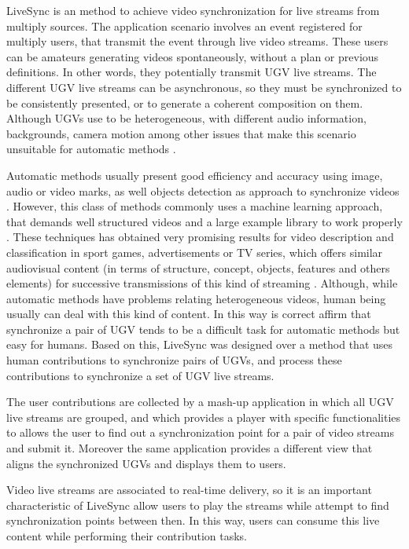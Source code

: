 
LiveSync is an method to achieve video synchronization for live streams from multiply sources. The application scenario involves an event registered for multiply users, that transmit the event through live video streams. These users can be amateurs generating videos spontaneously, without a plan or previous definitions. In other words, they potentially transmit UGV live streams. The different UGV live streams can be asynchronous, so they must be synchronized to be consistently presented, or to generate a coherent composition on them. Although UGVs use to be heterogeneous, with different audio information, backgrounds, camera motion among other issues that make this scenario unsuitable for automatic methods \cite{schweiger2013fully}.

Automatic methods usually present good efficiency and accuracy using image, audio or video marks, as well objects detection as approach to synchronize videos \cite{key:article}. However, this class of methods commonly uses a machine learning approach, that demands well structured videos and a large example library to work properly \cite{KarpathyCVPR14}. These techniques has obtained very promising results for video description and classification in sport games, advertisements or TV series, which offers similar audiovisual content (in terms of structure, concept, objects, features and others elements) for successive transmissions of this kind of streaming \cite{6909619}. Although, while automatic methods have problems relating heterogeneous videos,  human being usually can deal with this kind of content. In this way is correct affirm that synchronize a pair of UGV tends to be a difficult task for automatic methods but easy for humans. Based on this, LiveSync was designed over a method that uses human contributions to synchronize pairs of UGVs, and process these contributions to synchronize a set of UGV live streams.

The user contributions are collected by a mash-up application in which all UGV live streams are grouped, and which provides a player with specific functionalities to allows the user to find out a synchronization point for a pair of video streams and submit it. Moreover the same application provides a different view that aligns the synchronized UGVs and displays them to users.

Video live streams are associated to real-time delivery, so it is an important characteristic of LiveSync allow users to play the streams while attempt to find synchronization points between then. In this way, users can consume this live content while performing their contribution tasks.

